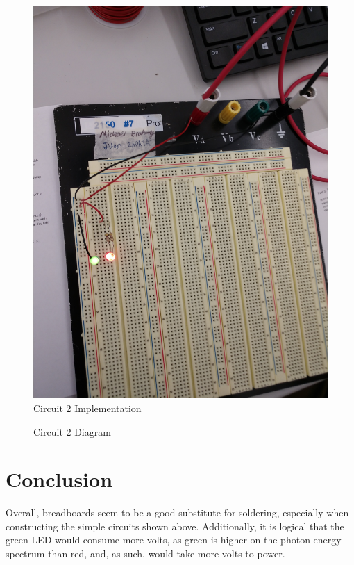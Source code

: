 \documentclass[
	letterpaper, %
	10pt, %
]{CSUniSchoolLabReport}
\begin{document}
\begin{multicols}{2}

\begin{figure}[H]
  \centering
  \includegraphics[width=.45\textwidth]{Figures/L1C2.jpg}
  \caption{Circuit 2 Implementation}
  \label{fig:3}
\end{figure}

\begin{figure}[H]
  \centering
  
  \caption{Circuit 2 Diagram}
  \label{fig:4}
\end{figure}

\end{multicols}

\section{Conclusion}

Overall, breadboards seem to be a good substitute for soldering, especially when constructing the simple circuits shown above. Additionally, it is logical that the green LED would consume more volts, as green is higher on the photon energy spectrum than red, and, as such, would take more volts to power.
\end{document}
